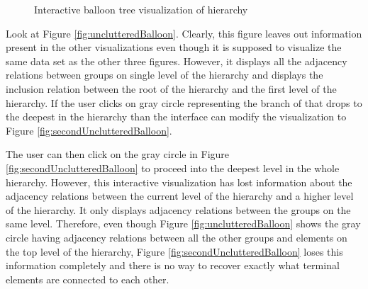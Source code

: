 \begin{figure}[htb]
\centering
{}
\caption{Interactive balloon tree visualization of hierarchy}
\label{fig:interactiveBalloon}
\end{figure}

Look at Figure \ref{fig:unclutteredBalloon}. Clearly, this figure leaves out information present in the other visualizations even though it is supposed to visualize the same data set as the other three figures. However, it displays all the adjacency relations between groups on single level of the hierarchy and displays the inclusion relation between the root of the hierarchy and the first level of the hierarchy. If the user clicks on gray circle representing the branch of that drops to the deepest in the hierarchy than the interface can modify the visualization to Figure \ref{fig:secondUnclutteredBalloon}.

The user can then click on the gray circle in Figure \ref{fig:secondUnclutteredBalloon} to proceed into the deepest level in the whole hierarchy. However, this interactive visualization has lost information about the adjacency relations between the current level of the hierarchy and a higher level of the hierarchy. It only displays adjacency relations between the groups on the same level. Therefore, even though Figure \ref{fig:unclutteredBalloon} shows the gray circle having adjacency relations between all the other groups and elements on the top level of the hierarchy, Figure \ref{fig:secondUnclutteredBalloon} loses this information completely and there is no way to recover exactly what terminal elements are connected to each other.

